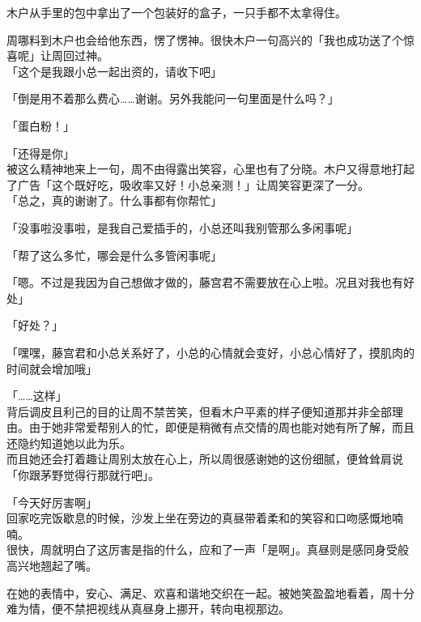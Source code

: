 木户从手里的包中拿出了一个包装好的盒子，一只手都不太拿得住。

周哪料到木户也会给他东西，愣了愣神。很快木户一句高兴的「我也成功送了个惊喜呢」让周回过神。\\

「这个是我跟小总一起出资的，请收下吧」

「倒是用不着那么费心……谢谢。另外我能问一句里面是什么吗？」

「蛋白粉！」

「还得是你」\\

被这么精神地来上一句，周不由得露出笑容，心里也有了分晓。木户又得意地打起了广告「这个既好吃，吸收率又好！小总亲测！」让周笑容更深了一分。\\

「总之，真的谢谢了。什么事都有你帮忙」

「没事啦没事啦，是我自己爱插手的，小总还叫我别管那么多闲事呢」

「帮了这么多忙，哪会是什么多管闲事呢」

「嗯。不过是我因为自己想做才做的，藤宫君不需要放在心上啦。况且对我也有好处」

「好处？」

「嘿嘿，藤宫君和小总关系好了，小总的心情就会变好，小总心情好了，摸肌肉的时间就会增加哦」

「……这样」\\

背后调皮且利己的目的让周不禁苦笑，但看木户平素的样子便知道那并非全部理由。由于她非常爱帮别人的忙，即便是稍微有点交情的周也能对她有所了解，而且还隐约知道她以此为乐。\\

而且她还会打着趣让周别太放在心上，所以周很感谢她的这份细腻，便耸耸肩说「你跟茅野觉得行那就行吧」。\\

\vspace{2\baselineskip}

「今天好厉害啊」\\

回家吃完饭歇息的时候，沙发上坐在旁边的真昼带着柔和的笑容和口吻感慨地喃喃。\\

很快，周就明白了这厉害是指的什么，应和了一声「是啊」。真昼则是感同身受般高兴地翘起了嘴。

在她的表情中，安心、满足、欢喜和谐地交织在一起。被她笑盈盈地看着，周十分难为情，便不禁把视线从真昼身上挪开，转向电视那边。\\

